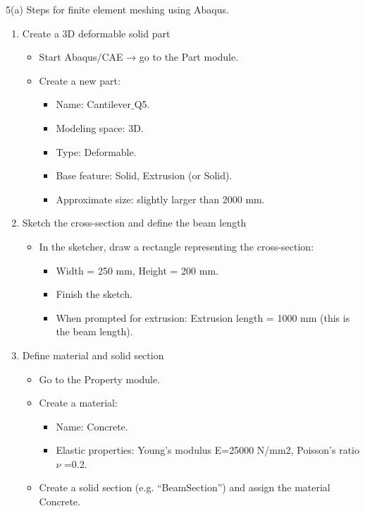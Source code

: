 \documentclass{homework}
\begin{document}
\begin{solution}
5(a)\label{prob:{5a}} Steps for finite element meshing using Abaqus. 
    \begin{enumerate}
        \item Create a 3D deformable solid part
        \begin{itemize}
            \item Start Abaqus/CAE → go to the Part module.
            \item Create a new part:
            \begin{itemize}
                \item Name: Cantilever$\_$Q5.
                \item Modeling space: 3D.
                \item Type: Deformable.
                \item Base feature: Solid, Extrusion (or Solid).
                \item  Approximate size: slightly larger than 2000 mm.
            \end{itemize}
        \end{itemize}
        \item Sketch the cross-section and define the beam length
        \begin{itemize}
            \item In the sketcher, draw a rectangle representing the cross-section:
            \begin{itemize}
                \item Width = 250 mm, Height = 200 mm.
                \item Finish the sketch.
                \item When prompted for extrusion: Extrusion length = 1000 mm (this is the beam length).
            \end{itemize}
        \end{itemize}
        \item Define material and solid section
        \begin{itemize}
            \item Go to the Property module.
            \item Create a material:
            \begin{itemize}
                \item Name: Concrete.
                \item Elastic properties: Young’s modulus E=25000 N/mm2, Poisson’s ratio $\nu$ =0.2.
            \end{itemize}
            \item Create a solid section (e.g. “BeamSection”) and assign the material Concrete.

\end{itemize}
\end{enumerate}
\end{solution}
\end{document}
